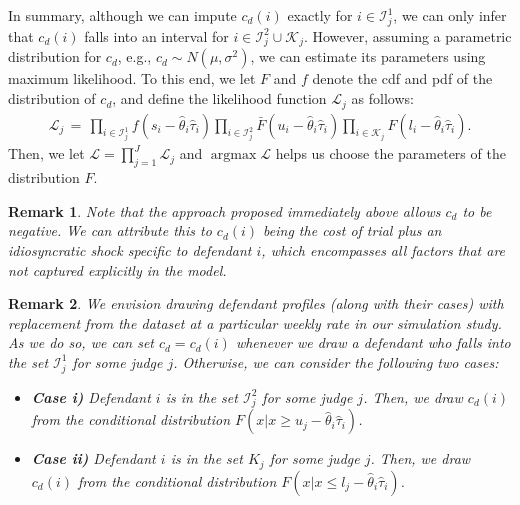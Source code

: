 \documentclass[11pt, oneside]{article}   	%
\theoremstyle{ModifiedStyle}
\newtheorem{remark}{Remark}
\DeclareMathOperator*{\argmax}{argmax}
\begin{document}
In summary, although we can impute $c_d(i)$ exactly for $i\in\mathcal{I}_j^1$, we can only infer that $c_d(i)$ falls into an interval for $i\in\mathcal{I}^2_j\cup \mathcal{K}_j$. However, assuming a parametric distribution for $c_d$, e.g., $c_d \sim N(\mu,\sigma^2)$, we can estimate its parameters using maximum likelihood. To this end, we let $F$ and $f$ denote the cdf and pdf of the distribution of $c_d$, and define the likelihood function $\mathscr{L}_j$ as follows:
\begin{align*}
	\mathscr{L}_j \,=\, \prod_{i\in\mathcal{I}_j^1} f(s_i-\hat{\theta}_i\hat{\tau}_i) \prod_{i\in\mathcal{I}_j^2} \bar{F}(u_i-\hat{\theta}_i\hat{\tau}_i) \prod_{i\in \mathcal{K}_j} F(l_i-\hat{\theta}_i\hat{\tau}_i). 
\end{align*}
Then, we let $\mathscr{L} = \prod_{j=1}^J \mathscr{L}_j$ and $\argmax \mathscr{L}$ helps us choose the parameters of the distribution $F$.
\begin{remark}
	Note that the approach proposed immediately above allows $c_d$ to be negative. We can attribute this to $c_d(i)$ being the cost of trial plus an idiosyncratic shock specific to defendant $i$, which encompasses all factors that are not captured explicitly in the model.
\end{remark}
\begin{remark}
	We envision drawing defendant profiles (along with their cases) with replacement from the dataset at a particular weekly rate in our simulation study. As we do so, we can set $c_d = c_d(i)$ whenever we draw a defendant who falls into the set $\mathcal{I}_j^1$ for some judge $j$. Otherwise, we can consider the following two cases:
	\begin{itemize}
		\vspace{-2mm}
		\item[] \hspace{-10mm}\textbf{Case i)} Defendant $i$ is in the set $\mathcal{I}_j^2$ for some judge $j$. Then, we draw $c_d(i)$ from the conditional distribution $F(x|x\geq u_j-\hat{\theta}_i\hat{\tau}_i)$.
		\vspace{-2mm}
		\item[] \hspace{-10mm}\textbf{Case ii)} Defendant $i$ is in the set $K_j$ for some judge $j$. Then, we draw $c_d(i)$ from the conditional distribution $F(x|x\leq l_j-\hat{\theta}_i\hat{\tau}_i)$.
	\end{itemize}
\end{remark}
%
\vspace{-3mm}
\end{document}
